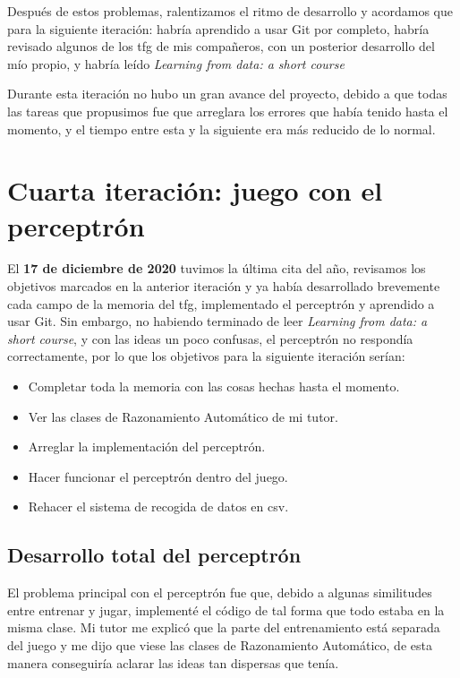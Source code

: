 Después de estos problemas, ralentizamos el ritmo de desarrollo y acordamos que para la siguiente iteración: habría aprendido a usar Git por completo, habría revisado algunos de los \gls{tfg} de mis compañeros, con un posterior desarrollo del mío propio, y habría leído \textit{Learning from data: a short course} \cite{LearningFromData}

Durante esta iteración no hubo un gran avance del proyecto, debido a que todas las tareas que propusimos fue que arreglara los errores que había tenido hasta el momento, y el tiempo entre esta y la siguiente era más reducido de lo normal.

\section{Cuarta iteración: juego con el perceptrón}
El \textbf{17 de diciembre de 2020} tuvimos la última cita del año, revisamos los objetivos marcados en la anterior iteración y ya había desarrollado brevemente cada campo de la memoria del \gls{tfg}, implementado el perceptrón y aprendido a usar Git. Sin embargo, no habiendo terminado de leer \textit{Learning from data: a short course}, y con las ideas un poco confusas, el perceptrón no respondía correctamente, por lo que los objetivos para la siguiente iteración serían:
\begin{itemize}
  \item Completar toda la memoria con las cosas hechas hasta el momento.
  \item Ver las clases de Razonamiento Automático de mi tutor.
  \item Arreglar la implementación del perceptrón.
  \item Hacer funcionar el perceptrón dentro del juego.
  \item Rehacer el sistema de recogida de datos en \gls{csv}.
\end{itemize}

\subsection{Desarrollo total del perceptrón}
El problema principal con el perceptrón fue que, debido a algunas similitudes entre entrenar y jugar, implementé el código de tal forma que todo estaba en la misma clase. Mi tutor me explicó que la parte del entrenamiento está separada del juego y me dijo que viese las clases de Razonamiento Automático, de esta manera conseguiría aclarar las ideas tan dispersas que tenía.


